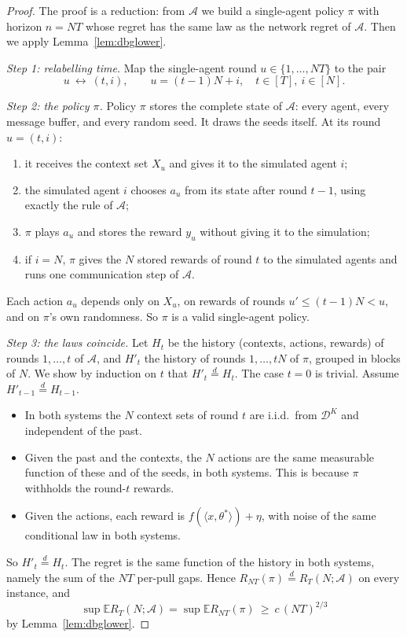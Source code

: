 \documentclass[11pt]{article}
\theoremstyle{definition}
\newcommand{\E}{\mathbb{E}}
\begin{document}
\begin{proof}
The proof is a reduction: from $\mathcal A$ we build a single-agent policy $\pi$ with horizon $n=NT$ whose regret
has the same law as the network regret of $\mathcal A$. Then we apply Lemma~\ref{lem:dbglower}.

\emph{Step 1: relabelling time.} Map the single-agent round $u\in\{1,\dots,NT\}$ to the pair
\[
u\ \longleftrightarrow\ (t,i),\qquad u=(t-1)N+i,\quad t\in[T],\ i\in[N].
\]

\emph{Step 2: the policy $\pi$.} Policy $\pi$ stores the complete state of $\mathcal A$: every agent, every
message buffer, and every random seed. It draws the seeds itself. At its round $u=(t,i)$:
\begin{enumerate}[nosep,label=(\alph*)]
\item it receives the context set $X_u$ and gives it to the simulated agent $i$;
\item the simulated agent $i$ chooses $a_u$ from its state after round $t-1$, using exactly the rule of $\mathcal A$;
\item $\pi$ plays $a_u$ and stores the reward $y_u$ without giving it to the simulation;
\item if $i=N$, $\pi$ gives the $N$ stored rewards of round $t$ to the simulated agents and runs one communication
step of $\mathcal A$.
\end{enumerate}
Each action $a_u$ depends only on $X_u$, on rewards of rounds $u'\le(t-1)N<u$, and on $\pi$'s own randomness.
So $\pi$ is a valid single-agent policy.

\emph{Step 3: the laws coincide.} Let $H_t$ be the history (contexts, actions, rewards) of rounds $1,\dots,t$ of
$\mathcal A$, and $H'_t$ the history of rounds $1,\dots,tN$ of $\pi$, grouped in blocks of $N$. We show by induction
on $t$ that $H'_t\overset{d}{=}H_t$. The case $t=0$ is trivial. Assume $H'_{t-1}\overset{d}{=}H_{t-1}$.
\begin{itemize}[nosep]
\item In both systems the $N$ context sets of round $t$ are i.i.d.\ from $\mathcal D^K$ and independent of the past.
\item Given the past and the contexts, the $N$ actions are the same measurable function of these and of the seeds,
in both systems. This is because $\pi$ withholds the round-$t$ rewards.
\item Given the actions, each reward is $f(\langle x,\theta^*\rangle)+\eta$, with noise of the same conditional law in both systems.
\end{itemize}
So $H'_t\overset{d}{=}H_t$. The regret is the same function of the history in both systems, namely the sum of the
$NT$ per-pull gaps. Hence $R_{NT}(\pi)\overset{d}{=}R_T(N;\mathcal A)$ on every instance, and
\[
\sup\E R_T(N;\mathcal A)=\sup\E R_{NT}(\pi)\ \ge\ c\,(NT)^{2/3}
\]
by Lemma~\ref{lem:dbglower}.
\end{proof}
\end{document}
